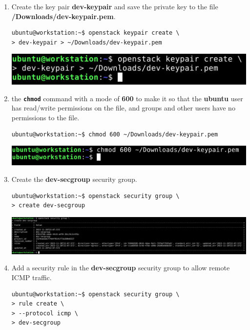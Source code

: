 \documentclass[letterpaper, 12pt]{article}
\begin{document}
\begin{enumerate}
    \item Create the key pair \textbf{dev-keypair} and save the private key to the file
\textbf{\texttildemid/Downloads/dev-keypair.pem}.
\begin{lstlisting}
ubuntu@workstation:~$ openstack keypair create \
> dev-keypair > ~/Downloads/dev-keypair.pem
\end{lstlisting}

    \begin{center}
        \includegraphics[width=\linewidth]{images/part1/step13.png}
    \end{center}

    \item the \textbf{\texttt{chmod}} command with a mode of \textbf{600} to make it so that the \textbf{ubuntu} user
has read/write permissions on the file, and groups and other users have no permissions to the file.
\begin{lstlisting}
ubuntu@workstation:~$ chmod 600 ~/Downloads/dev-keypair.pem
\end{lstlisting}

    \begin{center}
        \includegraphics[width=\linewidth]{images/part1/step14.png}
    \end{center}

    \item Create the \textbf{dev-secgroup} security group.
\begin{lstlisting}
ubuntu@workstation:~$ openstack security group \
> create dev-secgroup
\end{lstlisting}

    \begin{center}
        \includegraphics[width=\linewidth]{images/part1/step15.png}
    \end{center}

    \item Add a security rule in the \textbf{dev-secgroup} security group to allow remote ICMP traffic.
\begin{lstlisting}
ubuntu@workstation:~$ openstack security group \
> rule create \
> --protocol icmp \
> dev-secgroup
\end{lstlisting}


\end{enumerate}
\end{document}
